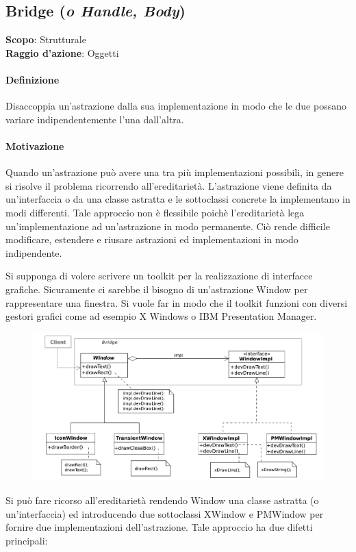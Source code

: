 \subsection{Bridge (\textit{o Handle, Body})}
\label{bridge}

\textbf{Scopo}: Strutturale \\
\textbf{Raggio d'azione}: Oggetti

\paragraph{Definizione} Disaccoppia un’astrazione dalla sua implementazione in modo che le due possano variare indipendentemente l’una dall’altra.

\paragraph{Motivazione} Quando un’astrazione può avere una tra più implementazioni possibili, in genere si risolve il problema ricorrendo all’ereditarietà. L’astrazione viene definita da un’interfaccia o da una classe astratta e le sottoclassi concrete la implementano in modi differenti. Tale approccio non è flessibile poichè l’ereditarietà lega un’implementazione ad un’astrazione in modo permanente. Ciò rende difficile modificare, estendere e riusare astrazioni ed implementazioni in modo indipendente.

Si supponga di volere scrivere un toolkit per la realizzazione di interfacce grafiche. Sicuramente ci sarebbe il bisogno di un’astrazione Window per rappresentare una finestra. Si vuole far in modo che il toolkit funzioni con diversi gestori grafici come ad esempio X Windows o IBM Presentation Manager.

\begin{figure}[H]
    \centering
    \includegraphics[width=0.75\linewidth]{assets/pattern/bridge/bridge-esempio.png}
\end{figure}

Si può fare ricorso all’ereditarietà rendendo Window una classe astratta (o un’interfaccia) ed introducendo due sottoclassi XWindow e PMWindow per fornire due implementazioni dell’astrazione. Tale approccio ha due difetti principali:


